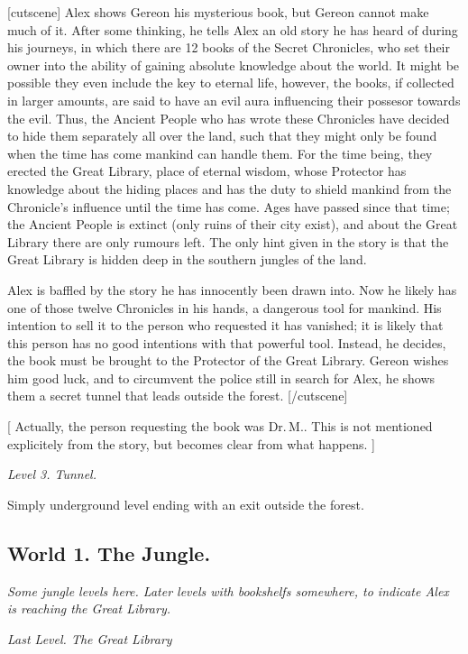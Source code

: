 \documentclass{gd-document}
\newcommand\DrM{Dr.\,M.\xspace}
\newcommand\level[1]{\textit{#1}}
\begin{document}
[cutscene]
Alex shows Gereon his mysterious book, but Gereon cannot make much of
it. After some thinking, he tells Alex an old story he has heard of
during his journeys, in which there are 12 books of the Secret
Chronicles, who set their owner into the ability of gaining absolute
knowledge about the world. It might be possible they even include the
key to eternal life, however, the books, if collected in larger
amounts, are said to have an evil aura influencing their possesor
towards the evil. Thus, the Ancient People who has wrote these
Chronicles have decided to hide them separately all over the land,
such that they might only be found when the time has come mankind can
handle them. For the time being, they erected the Great Library, place
of eternal wisdom, whose Protector has knowledge about the hiding
places and has the duty to shield mankind from the Chronicle’s
influence until the time has come. Ages have passed since that time;
the Ancient People is extinct (only ruins of their city exist), and
about the Great Library there are only rumours left. The only hint
given in the story is that the Great Library is hidden deep in the
southern jungles of the land.

Alex is baffled by the story he has innocently been drawn into. Now
he likely has one of those twelve Chronicles in his hands, a dangerous
tool for mankind. His intention to sell it to the person who requested
it has vanished; it is likely that this person has no good intentions
with that powerful tool. Instead, he decides, the book must be brought
to the Protector of the Great Library. Gereon wishes him good luck,
and to circumvent the police still in search for Alex, he shows them a
secret tunnel that leads outside the forest.
[/cutscene]

[ Actually, the person requesting the book was \DrM. This is not
mentioned explicitely from the story, but becomes clear from what
happens. ]

\level{Level 3. Tunnel.}

Simply underground level ending with an exit outside the forest.

\subsection{World 1. The Jungle.}

\level{Some jungle levels here. Later levels with bookshelfs
  somewhere, to indicate Alex is reaching the Great Library.}

\level{Last Level. The Great Library}
\end{document}
